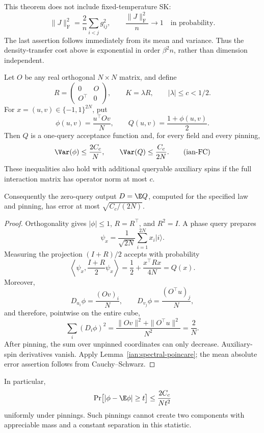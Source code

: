 This theorem does not include fixed-temperature SK:
\[
 \|J\|_{\mathrm F}^2=\frac2n\sum_{i<j}g_{ij}^2,
 \qquad
 \frac{\|J\|_{\mathrm F}^2}{n}\longrightarrow1
 \quad\text{in probability}.
\]
The last assertion follows immediately from its mean and variance.
Thus the density-transfer cost above is exponential in order
\(\beta^2n\), rather than dimension independent.

\begin{proposition}
\label{ian:hadamard-concentration}
Let \(O\) be any real orthogonal \(N\times N\) matrix, and define
\[
 R=\begin{pmatrix}0&O\\O^\top&0\end{pmatrix},
 \qquad K=\lambda R,\qquad |\lambda|\le c<1/2.
\]
For \(x=(u,v)\in\{-1,1\}^{2N}\), put
\[
 \phi(u,v)=\frac{u^\top Ov}{N},
 \qquad Q(u,v)=\frac{1+\phi(u,v)}2.
\]
Then \(Q\) is a one-query acceptance function and, for every field and
every pinning,
\[
 \Var(\phi)\le\frac{2C_c}{N},
 \qquad
 \Var(Q)\le\frac{C_c}{2N}.
 \tag{ian-FC}
\]
These inequalities also hold with additional queryable auxiliary spins
if the full interaction matrix has operator norm at most \(c\).

Consequently the zero-query output \(D=\E Q\), computed for the specified
law and pinning, has error at most \(\sqrt{C_c/(2N)}\).
\end{proposition}

\begin{proof}
Orthogonality gives \(|\phi|\le1\), \(R=R^\top\), and \(R^2=I\).
A phase query prepares
\[
 \psi_x=\frac1{\sqrt{2N}}\sum_{i=1}^{2N}x_i|i\rangle.
\]
Measuring the projection \((I+R)/2\) accepts with probability
\[
 \left\langle\psi_x,\frac{I+R}{2}\psi_x\right\rangle
 =\frac12+\frac{x^\top Rx}{4N}=Q(x).
\]
Moreover,
\[
 D_{u_i}\phi=\frac{(Ov)_i}{N},\qquad
 D_{v_j}\phi=\frac{(O^\top u)_j}{N},
\]
and therefore, pointwise on the entire cube,
\[
 \sum_i(D_i\phi)^2
 =\frac{\|Ov\|^2+\|O^\top u\|^2}{N^2}
 =\frac2N.
\]
After pinning, the sum over unpinned coordinates can only decrease.
Auxiliary-spin derivatives vanish. Apply
Lemma~\ref{ian:spectral-poincare}; the mean absolute error assertion
follows from Cauchy--Schwarz.
\end{proof}

In particular,
\[
 \Pr\bigl[|\phi-\E\phi|\ge t\bigr]\le\frac{2C_c}{Nt^2}
\]
uniformly under pinnings. Such pinnings cannot create two components
with appreciable mass and a constant separation in this statistic.


